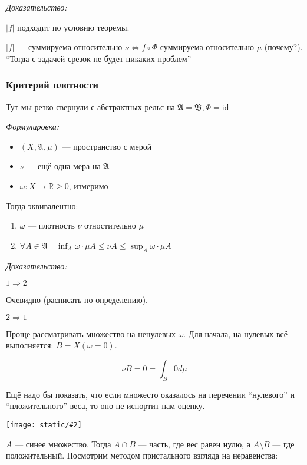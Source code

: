 \documentclass{article}
\def\images#1#2{\begin{center}\texttt{[image: static/\#2]}\end{center}}
\def\rinf{\overline{\mathbb{R}}}
\begin{document}
\textit{Доказательство:}

$|f|$ подходит по условию теоремы.

$|f|$ --- суммируема относительно $\nu \Leftrightarrow f \circ \Phi$ суммируема относительно $\mu$ (почему?). ``Тогда с задачей срезок не будет никаких проблем''

\subsubsection{Критерий плотности}

Тут мы резко свернули с абстрактных рельс на $\mathfrak{A} = \mathfrak{B}, \Phi = \text{id}$

\textit{Формулировка:}

\begin{itemize}
    \item $(X, \mathfrak{A}, \mu)$ --- пространство с мерой
    \item $\nu$ --- ещё одна мера на $\mathfrak{A}$
    \item $\omega: X \rightarrow \rinf \ge 0$, измеримо 
\end{itemize}

Тогда эквивалентно:

\begin{enumerate}
    \item $\omega$ --- плотность $\nu$ отностительно $\mu$
    \item $\forall A \in \mathfrak{A} \quad \inf_{A} \omega \cdot \mu A \le \nu A \le \sup_{A} \omega \cdot \mu A$
\end{enumerate}

\textit{Доказательство:}

\textbf{$1 \Rightarrow 2$}

Очевидно (расписать по определению).

\textbf{$2 \Rightarrow 1$}

Проще рассматривать множество на ненулевых $\omega$. Для начала, на нулевых всё выполняется: $B = X(\omega = 0)$.

\[\nu B = 0 = \int_{B} 0 d\mu\]

Ещё надо бы показать, что если множесто оказалось на перечении ``нулевого'' и ``пложительного'' веса, то оно не испортит нам оценку. 

\images{0.5}{kr_pl_1.jpg}

$A$ --- синее множество. Тогда $A \cap B$ --- часть, где вес равен нулю, а $A \setminus B$ --- где положительный. Посмотрим методом пристального взгляда на неравенства:
\end{document}
